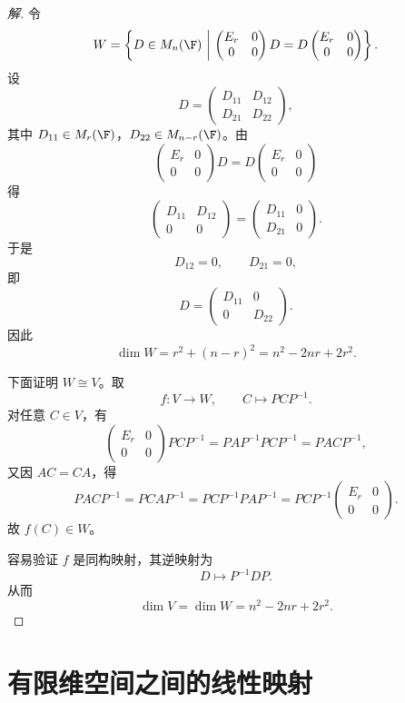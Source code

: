 \begin{proof}[解]
	令
	\[
	W=\left\{
	D\in M_n(\F)\ \middle|\ 
	\begin{pmatrix}
		E_r&0\\
		0&0
	\end{pmatrix}D
	=
	D\begin{pmatrix}
		E_r&0\\
		0&0
	\end{pmatrix}
	\right\}.
	\]
	设
	\[
	D=
	\begin{pmatrix}
		D_{11}&D_{12}\\
		D_{21}&D_{22}
	\end{pmatrix},
	\]
	其中 $D_{11}\in M_r(\F)$，$D_{22}\in M_{n-r}(\F)$。由
	\[
	\begin{pmatrix}
		E_r&0\\
		0&0
	\end{pmatrix}
	D
	=
	D
	\begin{pmatrix}
		E_r&0\\
		0&0
	\end{pmatrix}
	\]
	得
	\[
	\begin{pmatrix}
		D_{11}&D_{12}\\
		0&0
	\end{pmatrix}
	=
	\begin{pmatrix}
		D_{11}&0\\
		D_{21}&0
	\end{pmatrix}.
	\]
	于是
	\[
	D_{12}=0,\qquad D_{21}=0,
	\]
	即
	\[
	D=
	\begin{pmatrix}
		D_{11}&0\\
		0&D_{22}
	\end{pmatrix}.
	\]
	因此
	\[
	\dim W=r^2+(n-r)^2=n^2-2nr+2r^2.
	\]
	
	下面证明 $W\cong V$。取
	\[
	f:V\longrightarrow W,
	\qquad
	C\longmapsto PCP^{-1}.
	\]
	对任意 $C\in V$，有
	\[
	\begin{pmatrix}
		E_r&0\\
		0&0
	\end{pmatrix}PCP^{-1}
	=
	PAP^{-1}PCP^{-1}
	=
	PACP^{-1},
	\]
	又因 $AC=CA$，得
	\[
	PACP^{-1}
	=
	PCAP^{-1}
	=
	PCP^{-1}PAP^{-1}
	=
	PCP^{-1}
	\begin{pmatrix}
		E_r&0\\
		0&0
	\end{pmatrix}.
	\]
	故 $f(C)\in W$。
	
	容易验证 $f$ 是同构映射，其逆映射为
	\[
	D\longmapsto P^{-1}DP.
	\]
	从而
	\[
	\dim V=\dim W=n^2-2nr+2r^2.
	\]
\end{proof}
\section{有限维空间之间的线性映射}

